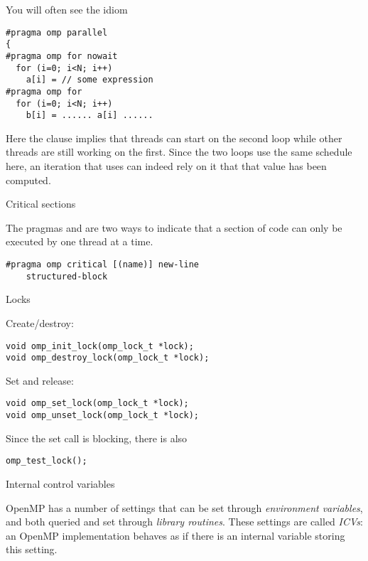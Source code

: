 You will often see the idiom
\begin{verbatim}
#pragma omp parallel
{
#pragma omp for nowait
  for (i=0; i<N; i++)
    a[i] = // some expression
#pragma omp for
  for (i=0; i<N; i++)
    b[i] = ...... a[i] ......
\end{verbatim}
Here the  clause implies that threads can start on the second loop
while other threads are still working on the first. Since the two loops use the same
schedule here, an iteration that uses  can indeed rely on it that that 
value has been computed.

 {Critical sections}

The pragmas  and 
are two ways to indicate that a section of code can only be executed
by one thread at a time.

\begin{verbatim}
#pragma omp critical [(name)] new-line
    structured-block
\end{verbatim}

 {Locks}
\label{ompref:locks}

Create/destroy:
\begin{verbatim}
void omp_init_lock(omp_lock_t *lock);
void omp_destroy_lock(omp_lock_t *lock);
\end{verbatim}
Set and release:
\begin{verbatim}
void omp_set_lock(omp_lock_t *lock);
void omp_unset_lock(omp_lock_t *lock);
\end{verbatim}
Since the set call is blocking, there is also 
\begin{verbatim}
omp_test_lock();
\end{verbatim}

 {Internal control variables}
\label{ref:omp-environ}

OpenMP has a number of settings that can be set through \emph{environment variables},
and both queried and set through \emph{library routines}. These settings are called
\emph{\acfp{ICV}}: an OpenMP implementation behaves as if there is an internal variable
storing this setting.

